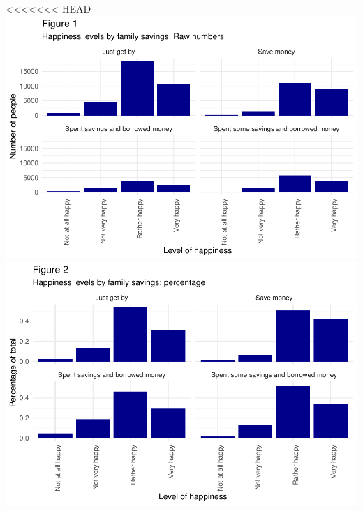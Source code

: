 \documentclass[man, fleqn, noextraspace,floatsintext]{apa6}
\begin{document}
<<<<<<< HEAD
\includegraphics{610_final_files/figure-latex/happiness and family savings JW-1.pdf} \includegraphics{610_final_files/figure-latex/happiness and family savings JW-2.pdf}
\end{document}
